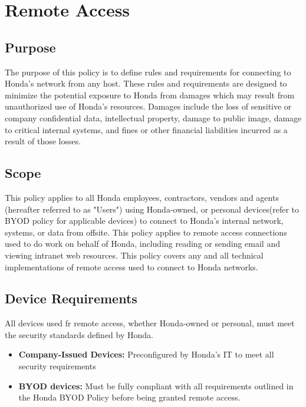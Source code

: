 \chapter{Remote Access}
\pagestyle{fancy}

\fancyhf{}

\fancyfoot[C]{\thepage}

\renewcommand{\headrulewidth}{0pt}
\renewcommand{\footrulewidth}{0pt}

\section{Purpose}
The purpose of this policy is to define rules and requirements for connecting to Honda's network from any host. These rules and requirements are designed to minimize the potential exposure to Honda from damages which may result from unauthorized use of Honda's resources. Damages include the loss of sensitive or company confidential data, intellectual property, damage to public image, damage to critical internal systems, and fines or other financial liabilities incurred as a result of those losses.

\section{Scope}
This policy applies to all Honda employees, contractors, vendors and agents (hereafter referred to as "Users") using Honda-owned, or personal devices(refer to BYOD policy for applicable devices) to connect to Honda's internal network, systems, or data from offsite. This policy applies to remote access connections used to do work on behalf of Honda, including reading or sending email and viewing intranet web resources. This policy covers any and all technical implementations of remote access used to connect to Honda networks.

\section{Device Requirements}
All devices used fr remote access, whether Honda-owned or personal, must meet the security standards defined by Honda.
\begin{itemize}
    \item \textbf{Company-Issued Devices:} Preconfigured by Honda's IT to meet all security requirements
    \item \textbf{BYOD devices:} Must be fully compliant with all requirements outlined in the Honda BYOD Policy before being granted remote access.
\end{itemize}
    
